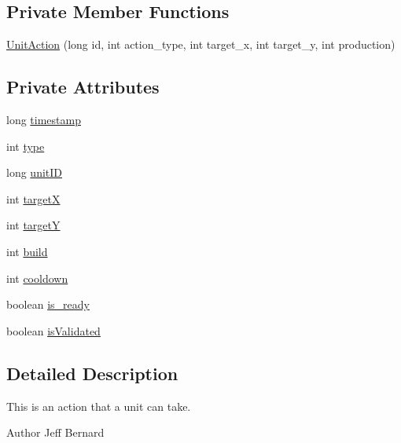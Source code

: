 \subsection*{Private Member Functions}
\begin{DoxyCompactItemize}
\item 
\hyperlink{classrts_1_1units_1_1_unit_action_a2d20f6eeb51fbbb2ad6fd9de0ebc7deb}{UnitAction} (long id, int action\_\-type, int target\_\-x, int target\_\-y, int production)
\end{DoxyCompactItemize}
\subsection*{Private Attributes}
\begin{DoxyCompactItemize}
\item 
long \hyperlink{classrts_1_1units_1_1_unit_action_ab2f5314049fc69ab11801c3133193246}{timestamp}
\item 
int \hyperlink{classrts_1_1units_1_1_unit_action_a17c35f7f6e20e9ddaf0beef22033ba16}{type}
\item 
long \hyperlink{classrts_1_1units_1_1_unit_action_a734ac068782831271b29ec3dc6726ddb}{unitID}
\item 
int \hyperlink{classrts_1_1units_1_1_unit_action_a186f77304bc2af95767e71d46bcc0d37}{targetX}
\item 
int \hyperlink{classrts_1_1units_1_1_unit_action_a2cca81f6237c185071a5e45795da93bd}{targetY}
\item 
int \hyperlink{classrts_1_1units_1_1_unit_action_a9580a2a6c1e668979f0ea0059e55988c}{build}
\item 
int \hyperlink{classrts_1_1units_1_1_unit_action_a87be8a59b99c285c0677e62c89965a9d}{cooldown}
\item 
boolean \hyperlink{classrts_1_1units_1_1_unit_action_a2bbb072721d535c656269075f6ce813d}{is\_\-ready}
\item 
boolean \hyperlink{classrts_1_1units_1_1_unit_action_a6a4db4f90844b5fc736c3935bdd266ff}{isValidated}
\end{DoxyCompactItemize}


\subsection{Detailed Description}
This is an action that a unit can take. 

\begin{DoxyAuthor}{Author}
Jeff Bernard 
\end{DoxyAuthor}


